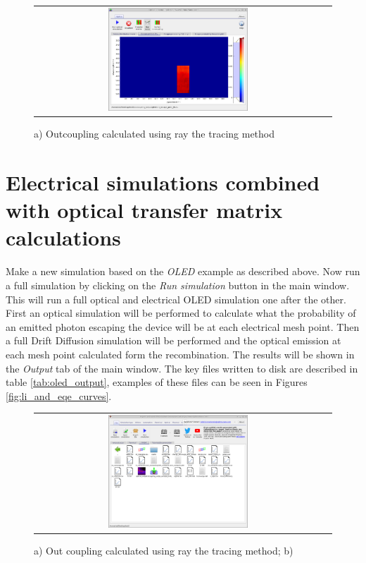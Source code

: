 \begin{figure}[H]
\centering
\begin{tabular}{ c c }

\includegraphics[width=0.5\textwidth,height=0.4\textwidth]{./images/oled/ray_trace_efficiency.png}

\\
\end{tabular}
\caption{a) Outcoupling calculated using ray the tracing method}
\label{fig:outcoupling_ray}
\end{figure}

\newpage
\section{Electrical simulations combined with optical transfer matrix calculations}
Make a new simulation based on the \emph{OLED} example as described above. Now run a full simulation by clicking on the \emph{Run simulation} button in the main window. This will run a full optical and electrical OLED simulation one after the other.  First an optical simulation will be performed to calculate what the probability of an emitted photon escaping the device will be at each electrical mesh point. Then a full Drift Diffusion simulation will be performed and the optical emission at each mesh point calculated form the recombination. The results will be shown in the \emph{Output} tab of the main window. The key files written to disk are described in table \ref{tab:oled_output}, examples of these files can be seen in Figures \ref{fig:li_and_eqe_curves}.

\begin{figure}[H]
\centering
\begin{tabular}{ c c }

\includegraphics[width=0.5\textwidth,height=0.4\textwidth]{./images/oled/results.png}

\\
\end{tabular}
\caption{a) Out coupling calculated using ray the tracing method; b) }
\label{fig:oled3}
\end{figure}

